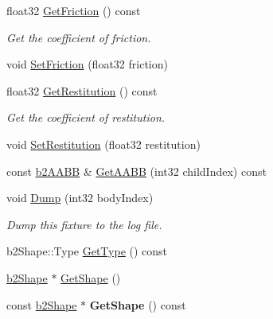 \begin{DoxyCompactItemize}
\mbox{\label{classb2Fixture_a2853d799f299cb1ce76e48261d42a5ad}} 
float32 \hyperlink{classb2Fixture_a2853d799f299cb1ce76e48261d42a5ad}{Get\+Friction} () const
\begin{DoxyCompactList}\small\item\em Get the coefficient of friction. \end{DoxyCompactList}\item 
void \hyperlink{classb2Fixture_ad0cd91eef5858c8ef1d6b62cc2a34ea2}{Set\+Friction} (float32 friction)
\item 
\mbox{\label{classb2Fixture_ac30becb6f936a9cc825952ca2b40aa14}} 
float32 \hyperlink{classb2Fixture_ac30becb6f936a9cc825952ca2b40aa14}{Get\+Restitution} () const
\begin{DoxyCompactList}\small\item\em Get the coefficient of restitution. \end{DoxyCompactList}\item 
void \hyperlink{classb2Fixture_a19c507332e4f7bd04a05f00426f11ee4}{Set\+Restitution} (float32 restitution)
\item 
const \hyperlink{structb2AABB}{b2\+A\+A\+BB} \& \hyperlink{classb2Fixture_a158574dc389fec83a05b09ab715c4474}{Get\+A\+A\+BB} (int32 child\+Index) const
\item 
\mbox{\label{classb2Fixture_a57485e73a2063060e320c7176676cd5e}} 
void \hyperlink{classb2Fixture_a57485e73a2063060e320c7176676cd5e}{Dump} (int32 body\+Index)
\begin{DoxyCompactList}\small\item\em Dump this fixture to the log file. \end{DoxyCompactList}\item 
b2\+Shape\+::\+Type \hyperlink{classb2Fixture_a7a566c1e3b768f6a72ebc3b758aad70e}{Get\+Type} () const
\item 
\hyperlink{classb2Shape}{b2\+Shape} $\ast$ \hyperlink{classb2Fixture_a11240a63767be13d93209ea5ac967e4f}{Get\+Shape} ()
\item 
\mbox{\label{classb2Fixture_a22a332c3be988a5f864904d3634c34c6}} 
const \hyperlink{classb2Shape}{b2\+Shape} $\ast$ {\bfseries Get\+Shape} () const
\item 
\mbox{\label{classb2Fixture_a6198a81dcee0fe814d730383ebfa7038}} 

\end{DoxyCompactItemize}
